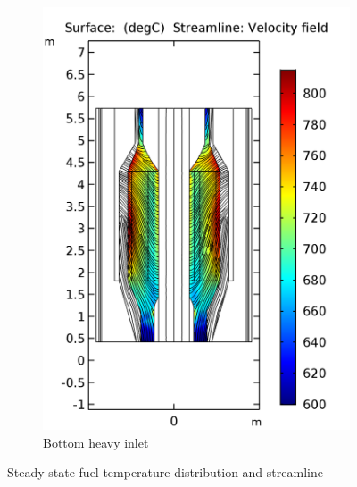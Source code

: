 \documentclass{elsarticle}
\begin{document}
\begin{figure}
    \begin{subfigure}[b]{0.45\textwidth}
        \centering
        \includegraphics[width=\textwidth]{images/diffusion/mk1/SS/flow_opti/T_fuel_bottom.png}
        \caption{Bottom heavy inlet}
    \end{subfigure}
  
  \caption{Steady state fuel temperature distribution and streamline}
  \label{fig:mk1_temp_fuel}
\end{figure}
\end{document}
